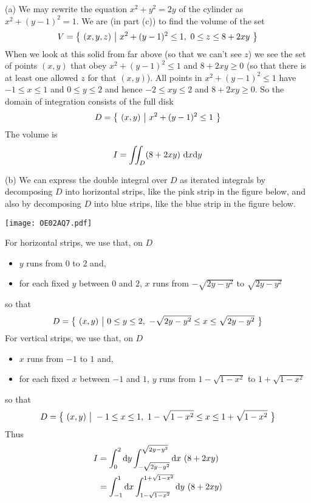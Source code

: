 \begin{solution}
(a) We may rewrite the equation $x^2+y^2=2y$ of the cylinder as
$x^2+(y-1)^2=1$. We are (in part (c)) to find the volume of the set
\begin{equation*}
V=\big\{ \ (x,y,z)\ \big|\ x^2+(y-1)^2\le 1,\ 0\le z\le 8+2xy\ \big\}
\end{equation*}
When we look at this solid from far above (so that we can't see $z$) 
we see the set of points $(x,y)$ that 
obey $x^2+(y-1)^2\le 1$ and $8+2xy\ge 0$ (so that there is at least one allowed $z$ for that $(x,y)$). All points in $x^2+(y-1)^2\le 1$
have $-1\le x\le 1$ and $0\le y\le 2$ and hence $-2\le xy\le 2$ and
$8+2xy\ge 0$. So the domain of integration consists of the full disk
\begin{equation*}
D = \big\{ \ (x,y)\ \big|\ x^2+(y-1)^2\le 1\ \big\}
\end{equation*}
The volume is 
\begin{equation*}
I=\dblInt_D (8+2xy)\ \dee{x}\dee{y}
\end{equation*}

(b)
We can express the double integral over $D$ as iterated integrals by
decomposing $D$ into horizontal strips, like the pink strip in the 
figure below, and also by decomposing $D$ into blue strips, like the 
blue strip in the figure below.
\begin{center}
     \texttt{[image: OE02AQ7.pdf]} 
\end{center}
For horizontal strips, we use that, on $D$
\begin{itemize}
\item
$y$ runs from $0$ to $2$ and,
\item
for each fixed $y$ between $0$ and $2$, $x$ runs from $-\sqrt{2y-y^2}$
to $\sqrt{2y-y^2}$ 
\end{itemize}
so that
\begin{equation*}
D=\Set{(x,y)}{0\le y\le 2,\ -\sqrt{2y-y^2}\le x\le \sqrt{2y-y^2}}
\end{equation*}
For vertical strips, we use that, on $D$
\begin{itemize}
\item
$x$ runs from $-1$ to $1$ and,
\item
for each fixed $x$ between $-1$ and $1$, $y$ runs from $1-\sqrt{1-x^2}$
to $1+\sqrt{1-x^2}$ 
\end{itemize}
so that
\begin{equation*}
D=\Set{(x,y)}{-1\le x\le 1,\ 1-\sqrt{1-x^2}\le x\le 1+\sqrt{1-x^2}}
\end{equation*}
Thus
\begin{align*}
I&=\int_0^2 \dee{y}\int_{-\sqrt{2y-y^2}}^{\sqrt{2y-y^2}}\dee{x}\ (8+2xy) \\
 &=\int_{-1}^1 \dee{x}\int_{1-\sqrt{1-x^2}}^{1+\sqrt{1-x^2}}\dee{y}\ (8+2xy)
\end{align*}


\end{solution}
